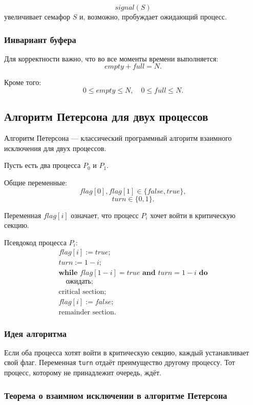 \documentclass[12pt,a4paper]{article}
\begin{document}
\[
signal(S)
\]
увеличивает семафор $S$ и, возможно, пробуждает ожидающий процесс.

\subsubsection{Инвариант буфера}

Для корректности важно, что во все моменты времени выполняется:
\[
empty + full = N.
\]

Кроме того:
\[
0 \leq empty \leq N,
\quad
0 \leq full \leq N.
\]

\subsection{Алгоритм Петерсона для двух процессов}

Алгоритм Петерсона --- классический программный алгоритм взаимного исключения для двух процессов.

Пусть есть два процесса $P_0$ и $P_1$.

Общие переменные:
\[
flag[0], flag[1] \in \{false, true\},
\]
\[
turn \in \{0,1\}.
\]

Переменная $flag[i]$ означает, что процесс $P_i$ хочет войти в критическую секцию.

Псевдокод процесса $P_i$:
\[
\begin{array}{l}
flag[i] := true;\\
turn := 1 - i;\\
\textbf{while } flag[1-i] = true \textbf{ and } turn = 1-i \textbf{ do}\\
\quad \text{ожидать};\\
\text{critical section};\\
flag[i] := false;\\
\text{remainder section}.
\end{array}
\]

\subsubsection{Идея алгоритма}

Если оба процесса хотят войти в критическую секцию, каждый устанавливает свой флаг. Переменная \texttt{turn} отдаёт преимущество другому процессу. Тот процесс, которому не принадлежит очередь, ждёт.

\subsubsection{Теорема о взаимном исключении в алгоритме Петерсона}
\end{document}

